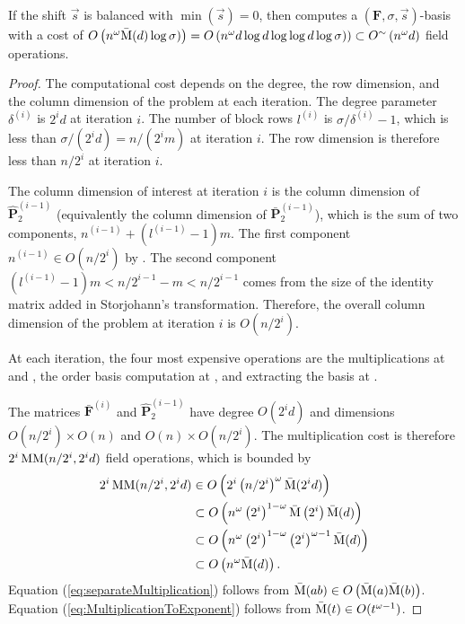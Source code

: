 \begin{thm}
\label{thm:balancedCost}If the shift $\vec{s}$ is balanced with
$\min\left(\vec{s}\right)=0$, then  computes
a $\left(\mathbf{F},\sigma,\vec{s}\right)$-basis with a cost of $O\left(n^{\omega}\bar{\M}(d)\log\sigma)\right)=O\left(n^{\omega}d\log d\log\log d\log\sigma)\right)\subset O^{\sim}\left(n^{\omega}d\right)$
 field operations. \end{thm}
\begin{proof}
The computational cost depends on the degree, the row dimension, and
the column dimension of the problem at each iteration. The degree
parameter $\delta^{\left(i\right)}$ is $2^{i}d$ at iteration $i$.
The number of block rows $l^{\left(i\right)}$ is $\sigma/\delta^{\left(i\right)}-1$,
which is less than $\sigma/(2^{i}d)=n/(2^{i}m)$ at iteration $i$.
The row dimension is therefore less than $n/2^{i}$ at iteration $i$.

The column dimension of interest at iteration $i$ is the column dimension
of $\hat{\mathbf{P}}_{2}^{\left(i-1\right)}$ (equivalently the column
dimension of $\bar{\mathbf{P}}_{2}^{\left(i-1\right)}$), which is
the sum of two components, $n^{\left(i-1\right)}+(l^{\left(i-1\right)}-1)m$.
The first component $n^{\left(i-1\right)}\in O(n/2^{i})$ by .
The second component $(l^{\left(i-1\right)}-1)m<n/2^{i-1}-m<n/2^{i-1}$
comes from the size of the identity matrix added in Storjohann's transformation.
Therefore, the overall column dimension of the problem at iteration
$i$ is $O(n/2^{i})$.

At each iteration, the four most expensive operations are the multiplications
at  and ,
the order basis computation at ,
and extracting the basis at .

The matrices $\bar{\mathbf{F}}^{\left(i\right)}$ and $\hat{\mathbf{P}}_{2}^{\left(i-1\right)}$
have degree $O(2^{i}d)$ and dimensions $O(n/2^{i})\times O\left(n\right)$
and $O\left(n\right)\times O(n/2^{i})$. The multiplication cost is
therefore $2^{i}\MM(n/2^{i},2^{i}d)$ field operations, which is bounded
by
\begin{align}
2^{i}\MM(n/2^{i},2^{i}d) & \in O\left(2^{i}\left(n/2^{i}\right)^{\omega}\bar{\M}(2^{i}d)\right)\nonumber \\
 & \subset O\left(n^{\omega}\left(2^{i}\right)^{1-\omega}\bar{\M}\left(2^{i}\right)\bar{\M}(d)\right)\label{eq:separateMultiplication}\\
 & \subset O\left(n^{\omega}\left(2^{i}\right)^{1-\omega}\left(2^{i}\right)^{\omega-1}\bar{\M}(d)\right)\label{eq:MultiplicationToExponent}\\
 & \subset O\left(n^{\omega}\bar{\M}(d)\right).\nonumber 
\end{align}
Equation (\ref{eq:separateMultiplication}) follows from $\bar{\M}(ab)\in O\left(\bar{\M}(a)\bar{\M}(b)\right)$.
Equation (\ref{eq:MultiplicationToExponent}) follows from $\bar{\M}(t)\in O(t^{\omega-1})$.


\end{proof}
